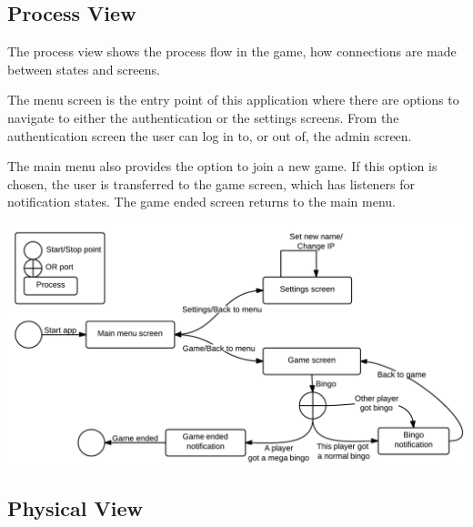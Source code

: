 \subsection{Process View}
The process view shows the process flow in the game, how connections are made
between states and screens.

The menu screen is the entry point of this application where there are options
to navigate to either the authentication or the settings screens. From the
authentication screen the user can log in to, or out of, the admin screen.

The main menu also provides the option to join a new game. If this option is
chosen, the user is transferred to the game screen, which has listeners for
notification states. The game ended screen returns to the main menu.
\begin{center}
\includegraphics[clip=true, width=0.9 \textwidth]{Pikks/ProcessViewFinal.png}
\label{ref:gantt}
\end{center}

\subsection{Physical View}
\begin{center}
\includegraphics[clip=true, width=0.9]{Pikks/PhysicalViewFinal}
\end{center}


